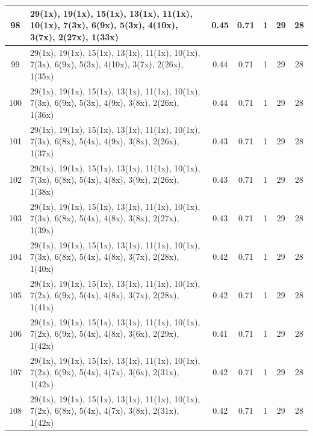 \begin{small}
\begin{longtable}{|c|p{4cm}|c|c|c|c|c|}
  98 & 29(1x), 19(1x), 15(1x), 13(1x), 11(1x), 10(1x), 7(3x), 6(9x), 5(3x), 4(10x), 3(7x), 2(27x), 1(33x) & \cellcolor{colorGood}  0.45 & \cellcolor{colorGood} 0.71 & 1 & 29 & \cellcolor{colorBad} 28 \\   \hline
  99 & 29(1x), 19(1x), 15(1x), 13(1x), 11(1x), 10(1x), 7(3x), 6(9x), 5(3x), 4(10x), 3(7x), 2(26x), 1(35x) & \cellcolor{colorGood}  0.44 & \cellcolor{colorGood} 0.71 & 1 & 29 & \cellcolor{colorBad} 28 \\   \hline
  100 & 29(1x), 19(1x), 15(1x), 13(1x), 11(1x), 10(1x), 7(3x), 6(9x), 5(3x), 4(9x), 3(8x), 2(26x), 1(36x) & \cellcolor{colorGood}  0.44 & \cellcolor{colorGood} 0.71 & 1 & 29 & \cellcolor{colorBad} 28 \\   \hline
  101 & 29(1x), 19(1x), 15(1x), 13(1x), 11(1x), 10(1x), 7(3x), 6(8x), 5(4x), 4(9x), 3(8x), 2(26x), 1(37x) & \cellcolor{colorGood}  0.43 & \cellcolor{colorGood} 0.71 & 1 & 29 & \cellcolor{colorBad} 28 \\   \hline
  102 & 29(1x), 19(1x), 15(1x), 13(1x), 11(1x), 10(1x), 7(3x), 6(8x), 5(4x), 4(8x), 3(9x), 2(26x), 1(38x) & \cellcolor{colorGood}  0.43 & \cellcolor{colorGood} 0.71 & 1 & 29 & \cellcolor{colorBad} 28 \\   \hline
  103 & 29(1x), 19(1x), 15(1x), 13(1x), 11(1x), 10(1x), 7(3x), 6(8x), 5(4x), 4(8x), 3(8x), 2(27x), 1(39x) & \cellcolor{colorGood}  0.43 & \cellcolor{colorGood} 0.71 & 1 & 29 & \cellcolor{colorBad} 28 \\   \hline
  104 & 29(1x), 19(1x), 15(1x), 13(1x), 11(1x), 10(1x), 7(3x), 6(8x), 5(4x), 4(8x), 3(7x), 2(28x), 1(40x) & \cellcolor{colorGood}  0.42 & \cellcolor{colorGood} 0.71 & 1 & 29 & \cellcolor{colorBad} 28 \\   \hline
  105 & 29(1x), 19(1x), 15(1x), 13(1x), 11(1x), 10(1x), 7(2x), 6(9x), 5(4x), 4(8x), 3(7x), 2(28x), 1(41x) & \cellcolor{colorGood}  0.42 & \cellcolor{colorGood} 0.71 & 1 & 29 & \cellcolor{colorBad} 28 \\   \hline
  106 & 29(1x), 19(1x), 15(1x), 13(1x), 11(1x), 10(1x), 7(2x), 6(9x), 5(4x), 4(8x), 3(6x), 2(29x), 1(42x) & \cellcolor{colorGood}  0.41 & \cellcolor{colorGood} 0.71 & 1 & 29 & \cellcolor{colorBad} 28 \\   \hline
  107 & 29(1x), 19(1x), 15(1x), 13(1x), 11(1x), 10(1x), 7(2x), 6(9x), 5(4x), 4(7x), 3(6x), 2(31x), 1(42x) & \cellcolor{colorGood}  0.42 & \cellcolor{colorGood} 0.71 & 1 & 29 & \cellcolor{colorBad} 28 \\   \hline
  108 & 29(1x), 19(1x), 15(1x), 13(1x), 11(1x), 10(1x), 7(2x), 6(8x), 5(4x), 4(7x), 3(8x), 2(31x), 1(42x) & \cellcolor{colorGood}  0.42 & \cellcolor{colorGood} 0.71 & 1 & 29 & \cellcolor{colorBad} 28 \\   \hline

\end{longtable}
\end{small}
